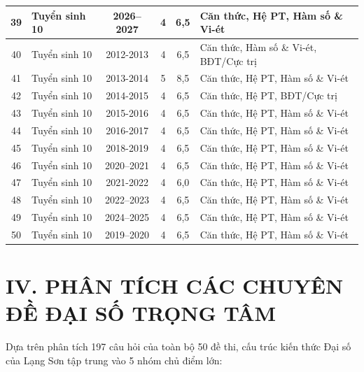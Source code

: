 \begin{center}
\begin{longtable}{|c|l|c|c|c|p{4.2cm}|}
39 & Tuyển sinh 10 & 2026--2027 & 4 & 6,5 & Căn thức, Hệ PT, Hàm số \& Vi-ét \\ \hline
40 & Tuyển sinh 10 & 2012-2013 & 4 & 6,5 & Căn thức, Hàm số \& Vi-ét, BĐT/Cực trị \\ \hline
41 & Tuyển sinh 10 & 2013-2014 & 5 & 8,5 & Căn thức, Hệ PT, Hàm số \& Vi-ét \\ \hline
42 & Tuyển sinh 10 & 2014-2015 & 4 & 6,5 & Căn thức, Hệ PT, BĐT/Cực trị \\ \hline
43 & Tuyển sinh 10 & 2015-2016 & 4 & 6,5 & Căn thức, Hệ PT, Hàm số \& Vi-ét \\ \hline
44 & Tuyển sinh 10 & 2016-2017 & 4 & 6,5 & Căn thức, Hệ PT, Hàm số \& Vi-ét \\ \hline
45 & Tuyển sinh 10 & 2018-2019 & 4 & 6,5 & Căn thức, Hệ PT, Hàm số \& Vi-ét \\ \hline
46 & Tuyển sinh 10 & 2020--2021 & 4 & 6,5 & Căn thức, Hệ PT, Hàm số \& Vi-ét \\ \hline
47 & Tuyển sinh 10 & 2021-2022 & 4 & 6,0 & Căn thức, Hệ PT, Hàm số \& Vi-ét \\ \hline
48 & Tuyển sinh 10 & 2022--2023 & 4 & 6,5 & Căn thức, Hệ PT, Hàm số \& Vi-ét \\ \hline
49 & Tuyển sinh 10 & 2024--2025 & 4 & 6,5 & Căn thức, Hệ PT, Hàm số \& Vi-ét \\ \hline
50 & Tuyển sinh 10 & 2019--2020 & 4 & 6,5 & Căn thức, Hệ PT, Hàm số \& Vi-ét \\ \hline
\end{longtable}
\end{center}

\section*{IV. PHÂN TÍCH CÁC CHUYÊN ĐỀ ĐẠI SỐ TRỌNG TÂM}

Dựa trên phân tích 197 câu hỏi của toàn bộ 50 đề thi, cấu trúc kiến thức Đại số của Lạng Sơn tập trung vào 5 nhóm chủ điểm lớn:

